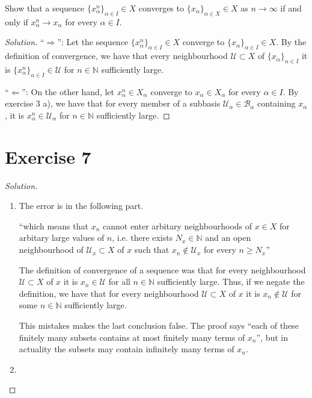 \documentclass[a4paper]{article}
\theoremstyle{definition}
\begin{document}
Show that a sequence \(\{x_\alpha^n\}_{\alpha \in I} \in X\) converges to \(\{x_\alpha\}_{\alpha \in X} \in X\) as \(n \longrightarrow \infty\) if and only if \(x^n_\alpha \longrightarrow x_\alpha\) for every \(\alpha \in I\).

\begin{proof}[Solution]
    ``\(\Rightarrow\)'': Let the sequence \(\{x_\alpha^n\}_{\alpha \in I} \in X\) converge to \(\{x_\alpha\}_{\alpha \in I} \in X\). By the definition of convergence, we have that every neighbourhood \(\mathcal{U} \subset X\) of \(\{x_\alpha\}_{\alpha \in I}\) it is \(\{x_\alpha^n\}_{\alpha \in I} \in \mathcal{U}\) for \(n \in \mathbb{N}\) sufficiently large.

    ``\(\Leftarrow\)'': On the other hand, let \(x^n_\alpha \in X_\alpha\) converge to \(x_\alpha \in X_\alpha\) for every \(\alpha \in I\). By exercise 3 a), we have that for every member of a subbasis \(\mathcal{U}_\alpha \in \mathcal{B}_\alpha\) containing \(x_\alpha\), it is \(x_\alpha^n \in \mathcal{U}_\alpha\) for \(n \in \mathbb{N}\) sufficiently large.
\end{proof}

\section*{Exercise 7}

\begin{proof}[Solution]
    \begin{enumerate}
        \item The error is in the following part.
    
        ``which means that \(x_n\) {\color{red}cannot enter} arbitary neighbourhoods of \(x \in X\) for arbitary large values of \(n\), i.e. there exists \(N_x \in \mathbb{N}\) and an open neighbourhood of \(\mathcal{U}_x \subset X\) of \(x\) such that \(x_n \not\in \mathcal{U}_x\) {\color{red}for every} \(n \geq N_x\)''
    
        The definition of convergence of a sequence was that for every neighbourhood \(\mathcal{U} \subset X\) of \(x\) it is \(x_n \in \mathcal{U}\) for all \(n \in \mathbb{N}\) sufficiently large. Thus, if we negate the definition, we have that for every neighbourhood \(\mathcal{U} \subset X\) of \(x\) it is \(x_n \not\in \mathcal{U}\) {\color{red}for some} \(n \in \mathbb{N}\) sufficiently large.
    
        This mistakes makes the last conclusion false. The proof says ``each of these finitely many subsets contains at most finitely many terms of \(x_n\)'', but in actuality the subsets may contain infinitely many terms of \(x_n\).
        \item 
    \end{enumerate}
\end{proof}
\end{document}
